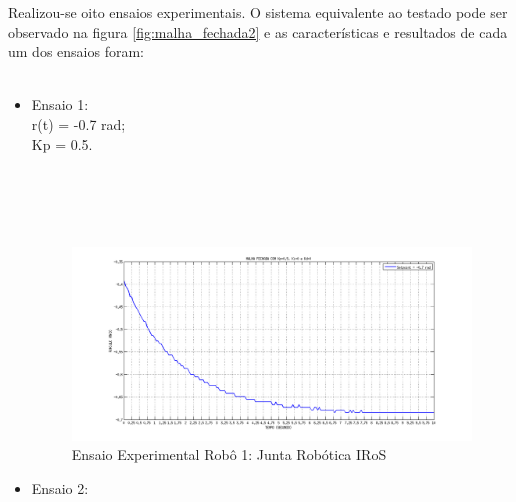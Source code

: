 \documentclass[12pt,oneside,a4paper, chapter=TITLE, section = TITLE, english, brazil]{abntex2}
\begin{document}
Realizou-se oito ensaios experimentais. O sistema equivalente ao testado pode ser observado na figura \ref{fig:malha_fechada2} e as características e resultados de cada um dos ensaios foram:\\
\\

\begin{itemize}

\item Ensaio 1:
\\

r(t) = -0.7 rad;\\
Kp = 0.5.\\
\\
\\
\\
\\

\begin{figure}[h] %
\centering
\includegraphics[scale=0.43]{./imagens/Ensaio1_1_robo}
\caption[Ensaio Experimental Robô 1: Junta Robótica IRoS]{Ensaio Experimental Robô 1: Junta Robótica IRoS}
\label{fig:ensaio1_1_robo}
\end{figure}

\item Ensaio 2:
\\
 

\end{itemize}
\end{document}
